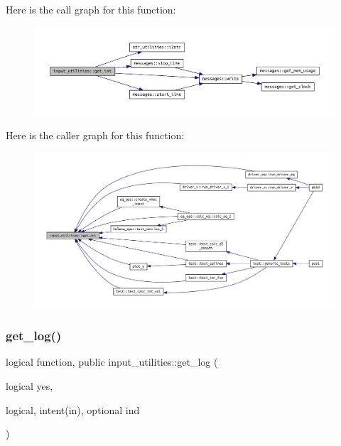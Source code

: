 Here is the call graph for this function\+:\nopagebreak
\begin{figure}[H]
\begin{center}
\leavevmode
\includegraphics[width=350pt]{namespaceinput__utilities_a03e09af96ba6f7e187ea4a1d9b743148_cgraph}
\end{center}
\end{figure}
Here is the caller graph for this function\+:
\nopagebreak
\begin{figure}[H]
\begin{center}
\leavevmode
\includegraphics[width=350pt]{namespaceinput__utilities_a03e09af96ba6f7e187ea4a1d9b743148_icgraph}
\end{center}
\end{figure}
\mbox{\label{namespaceinput__utilities_ad9ce824c30b32041ab70f3fb191f06db}} 
\subsubsection{\texorpdfstring{get\+\_\+log()}{get\_log()}}
{\footnotesize\ttfamily logical function, public input\+\_\+utilities\+::get\+\_\+log (\begin{DoxyParamCaption}\item[{logical}]{yes,  }\item[{logical, intent(in), optional}]{ind }\end{DoxyParamCaption})}



